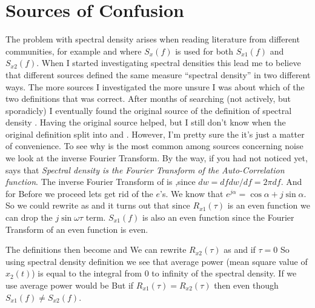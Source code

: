 \documentclass[final,a4paper]{IEEEtran}
\begin{document}
\section{Sources of Confusion}
The problem with spectral density arises when reading literature from
different communities, for example \cite{gray.r.m} and \cite{ziel} where
$S_x(f)$ is used for both $S_{x1}(f)$ and $S_{x2}(f)$. 
When I started investigating spectral densities this lead me to
believe that different sources defined the same measure
``spectral density'' in two different ways. The more sources I
investigated the more unsure I was about which of the two definitions
that was correct. After months of searching (not actively, but
sporadicly) I eventually found the original source of the definition
of spectral density \cite{einstein14}. Having the original source
helped, but I still don't know when the original definition split into  and
. However, I'm pretty sure the it's just a matter of
convenience. To see why  is the most common among sources
concerning noise we look at the inverse Fourier Transform.
By the way, if you had not
noticed yet,  says that {\em Spectral density is the Fourier
Transform of the Auto-Correlation function}.
The inverse Fourier Transform of  is
,since $dw = df dw/df = 2\pi df$. And for 
Before we proceed lets get rid of the $e$'s. We know that $e^{j\alpha} =
\cos \alpha + j \sin \alpha$. So we could rewrite  as
and it turns out that since $R_{x1}(\tau)$ is an even function we can
drop the $j\sin{\omega \tau}$ term. $S_{x1}(f)$ is also an even function
since the Fourier Transform of an even function is  even. 

The definitions then become
and
We can rewrite $R_{x2}(\tau)$ as 
and if $\tau = 0$
So using spectral density definition  we see that average
power (mean square value of $x_2(t)$) is equal to the integral from 0 to
infinity of the spectral density. If we use  average power
would be
But if $R_{x1}(\tau) = R_{x2}(\tau)$ then 
even though $S_{x1}(f) \neq S_{x2}(f)$.
\end{document}
